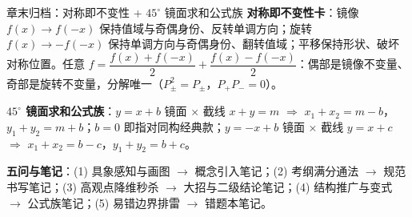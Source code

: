 \begin{notezone}{章末归档：对称即不变性 + $45^\circ$ 镜面求和公式族}
\textbf{对称即不变性卡}：镜像 $f(x)\to f(-x)$ 保持值域与奇偶身份、反转单调方向；旋转 $f(x)\to-f(-x)$ 保持单调方向与奇偶身份、翻转值域；平移保持形状、破坏对称位置。任意 $f=\dfrac{f(x)+f(-x)}{2}+\dfrac{f(x)-f(-x)}{2}$：偶部是镜像不变量、奇部是旋转不变量，分解唯一（$P_\pm^2=P_\pm$，$P_+P_-=0$）。

\textbf{$45^\circ$ 镜面求和公式族}：$y=x+b$ 镜面 × 截线 $x+y=m$ $\Rightarrow$ $x_1+x_2=m-b$，$y_1+y_2=m+b$；$b=0$ 即指对同构经典款；$y=-x+b$ 镜面 × 截线 $y=x+c$ $\Rightarrow$ $x_1+x_2=b-c$，$y_1+y_2=b+c$。

\textbf{五问与笔记}：(1) 具象感知与画图 $\to$ 概念引入笔记；(2) 考纲满分通法 $\to$ 规范书写笔记；(3) 高观点降维秒杀 $\to$ 大招与二级结论笔记；(4) 结构推广与变式 $\to$ 公式族笔记；(5) 易错边界排雷 $\to$ 错题本笔记。
\end{notezone}
